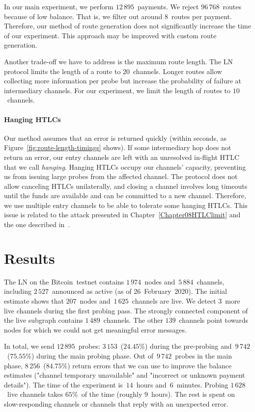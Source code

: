 In our main experiment, we perform $12\,895$~payments.
We reject $96\,768$~routes because of low balance.
That is, we filter out around $8$~routes per payment.
Therefore, our method of route generation does not significantly increase the time of our experiment.
This approach may be improved with custom route generation.

Another trade-off we have to address is the maximum route length.
The LN protocol limits the length of a route to $20$~channels.
Longer routes allow collecting more information per probe but increase the probability of failure at intermediary channels.
For our experiment, we limit the length of routes to $10$~channels.

\paragraph{Hanging HTLCs}
Our method assumes that an error is returned quickly (within seconds, as Figure~\ref{fig:route-length-timings} shows).
If some intermediary hop does not return an error, our entry channels are left with an unresolved in-flight HTLC that we call \textit{hanging}.
Hanging HTLCs occupy our channels' capacity, preventing us from issuing large probes from the affected channel.
The protocol does not allow canceling HTLCs unilaterally, and closing a channel involves long timeouts until the funds are available and can be committed to a new channel.
Therefore, we use multiple entry channels to be able to tolerate some hanging HTLCs.
This issue is related to the attack presented in Chapter~\ref{Chapter08HTLClimit} and the one described in~\cite{Mizrahi2020}.

\section{Results} \label{sec:results}

The LN on the Bitcoin~testnet contains $1\,974$~nodes and~$5\,884$~channels, including $2\,527$~announced as active (as of 26~February~2020).
The initial estimate shows that $207$~nodes and~$1\,625$~channels are live.
We detect $3$~more live channels during the first probing pass.
The strongly connected component of the live subgraph contains $1\,489$~channels.
The other $139$~channels point towards nodes for which we could not get meaningful error messages.

In total, we send $12\,895$~probes: $3\,153$~($24.45\%$) during the pre-probing and~$9\,742$~($75.55\%$) during the main probing phase.
Out of~$9\,742$~probes in the main phase, $8\,256$~($84.75\%$) return errors that we can use to improve the balance estimates ("channel temporary unavailable" and "incorrect or unknown payment details").
The time of the experiment is~$14$~hours and~$6$~minutes.
Probing $1\,628$~live channels takes $65\%$~of the time (roughly $9$~hours).
The rest is spent on slow-responding channels or channels that reply with an unexpected error.


